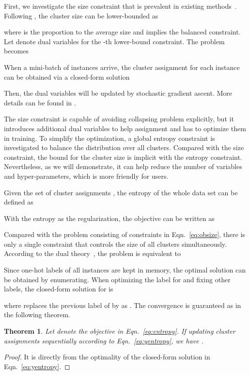 \documentclass[10pt,twocolumn,letterpaper]{article}
\newtheorem{thm}{Theorem}
\begin{document}
First, we investigate the size constraint that is prevalent in existing methods~\cite{CaronMMGBJ20,coke}. Following \cite{coke}, the cluster size can be lower-bounded as

where  is the proportion to the average size and  implies the balanced constraint. Let  denote dual variables for the -th lower-bound constraint. The problem becomes

When a mini-batch of instances arrive, the cluster assignment for each instance can be obtained via a closed-form solution

Then, the dual variables will be updated by stochastic gradient ascent. More details can be found in \cite{coke}.

The size constraint is capable of avoiding collapsing problem explicitly, but it introduces additional dual variables to help assignment and has to optimize them in training. To simplify the optimization, a global entropy constraint is investigated to balance the distribution over all clusters. Compared with the size constraint, the bound for the cluster size is implicit with the entropy constraint. Nevertheless, as we will demonstrate, it can help reduce the number of variables and hyper-parameters, which is more friendly for users. 

Given the set of cluster assignments , the entropy of the whole data set can be defined as

With the entropy as the regularization, the objective can be written as



Compared with the problem consisting of  constraints in Eqn.~\ref{eq:obsize}, there is only a single constraint that controls the size of all clusters simultaneously.
According to the dual theory~\cite{boyd2004convex}, the problem is equivalent to


Since one-hot labels of all instances are kept in memory, the optimal solution can be obtained by enumerating. When optimizing the label for  and fixing other labels, the closed-form solution for  is

where  replaces the previous label  of  by  as .
The convergence is guaranteed as in the following theorem.
\begin{thm}
Let  denote the objective in Eqn.~\ref{eq:entropy}. If updating cluster assignments sequentially according to Eqn.~\ref{eq:yentropy}, we have .
\end{thm}
\begin{proof}
It is directly from the optimality of the closed-form solution in Eqn.~\ref{eq:yentropy}.
\end{proof}
\end{document}
